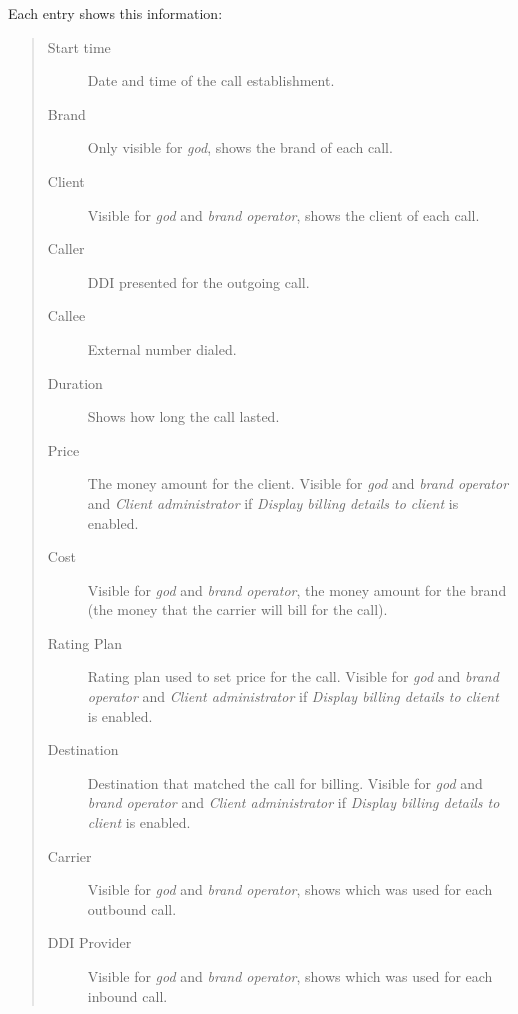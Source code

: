 \documentclass[letterpaper,10pt,spanish]{sphinxmanual}
\begin{document}
Each entry shows this information:
\begin{quote}
\begin{description}
\item[{Start time}] \leavevmode
Date and time of the call establishment.

\item[{Brand}] \leavevmode
Only visible for \emph{god}, shows the brand of each call.

\item[{Client}] \leavevmode
Visible for \emph{god} and \emph{brand operator}, shows the client of each call.

\item[{Caller}] \leavevmode
DDI presented for the outgoing call.

\item[{Callee}] \leavevmode
External number dialed.

\item[{Duration}] \leavevmode
Shows how long the call lasted.

\item[{Price}] \leavevmode
The money amount for the client. Visible for \emph{god} and \emph{brand operator} and \emph{Client administrator} if
\emph{Display billing details to client} is enabled.

\item[{Cost}] \leavevmode
Visible for \emph{god} and \emph{brand operator}, the money amount for the brand (the money that the carrier will bill for the call).

\item[{Rating Plan}] \leavevmode
Rating plan used to set price for the call. Visible for \emph{god} and \emph{brand operator} and \emph{Client administrator} if
\emph{Display billing details to client} is enabled.

\item[{Destination}] \leavevmode
Destination that matched the call for billing. Visible for \emph{god} and \emph{brand operator} and \emph{Client administrator} if
\emph{Display billing details to client} is enabled.

\item[{Carrier}] \leavevmode
Visible for \emph{god} and \emph{brand operator}, shows which {\hyperref[administration_portal/brand/providers/carriers:carriers]{}} was used for each outbound call.

\item[{DDI Provider}] \leavevmode
Visible for \emph{god} and \emph{brand operator}, shows which {\hyperref[administration_portal/brand/providers/ddi_providers:ddi\string-providers]{}} was used for each inbound call.


\end{description}
\end{quote}
\end{document}
